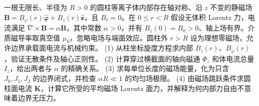 一根无限长、半径为 \(R>0\) 的圆柱等离子体内部存在轴对称、沿 \(z\) 不变的静磁场 \(\mathbf B=B_\varphi(r)\hat{\boldsymbol\varphi}+B_z(r)\hat{\mathbf z}\)，且 \(B_r=0\)。在 \(0\le r<R\) 假设无体积 Lorentz 力，电流满足 \(\nabla\times\mathbf B=\alpha\mathbf B\)，其中常数 \(\alpha>0\)，并有 \(B_z(0)=B_0>0\)、轴上场有界。介质磁导率取真空值 \(\mu_0\)，忽略电场与端面效应。圆柱外 \(r>R\) 设为理想零磁场，允许边界承载面电流与机械约束。
(1) 从柱坐标旋度方程求内部 \(B_z(r)\)、\(B_\varphi(r)\)，验证无散条件及轴心正则性。
(2) 计算穿过横截面的轴向磁通 \(\Phi_z\) 和体电流总量 \(I_z\)，给出两者与 \(\alpha\) 的精确关系。
(3) 求每单位长度的磁场能量，化为只含 \(J_0,J_1,J_2\) 的边界闭式，并检查 \(\alpha R\ll1\) 的均匀场极限。
(4) 由磁场跳跃条件求圆柱面电流 \(\mathbf K\)，计算它所受的平均磁场 Lorentz 面力，并解释为何内部力自由不意味着边界无压力。
